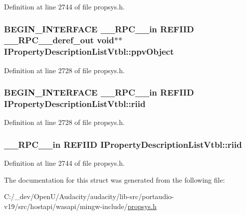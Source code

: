 Definition at line 2744 of file propsys.\+h.

\subsubsection[{\texorpdfstring{ppv\+Object}{ppvObject}}]{\setlength{\rightskip}{0pt plus 5cm}B\+E\+G\+I\+N\+\_\+\+I\+N\+T\+E\+R\+F\+A\+CE {\bf \+\_\+\+\_\+\+R\+P\+C\+\_\+\+\_\+in} {\bf R\+E\+F\+I\+ID} {\bf \+\_\+\+\_\+\+R\+P\+C\+\_\+\+\_\+deref\+\_\+out} {\bf void}$\ast$$\ast$ I\+Property\+Description\+List\+Vtbl\+::ppv\+Object}\hypertarget{struct_i_property_description_list_vtbl_a56cb57bc76ce9ed78155e1438c44836e}{}\label{struct_i_property_description_list_vtbl_a56cb57bc76ce9ed78155e1438c44836e}


Definition at line 2728 of file propsys.\+h.

\subsubsection[{\texorpdfstring{riid}{riid}}]{\setlength{\rightskip}{0pt plus 5cm}B\+E\+G\+I\+N\+\_\+\+I\+N\+T\+E\+R\+F\+A\+CE {\bf \+\_\+\+\_\+\+R\+P\+C\+\_\+\+\_\+in} {\bf R\+E\+F\+I\+ID} I\+Property\+Description\+List\+Vtbl\+::riid}\hypertarget{struct_i_property_description_list_vtbl_a314c26361430b79aed953c862b695f7f}{}\label{struct_i_property_description_list_vtbl_a314c26361430b79aed953c862b695f7f}


Definition at line 2728 of file propsys.\+h.

\subsubsection[{\texorpdfstring{riid}{riid}}]{ {\bf \+\_\+\+\_\+\+R\+P\+C\+\_\+\+\_\+in} {\bf R\+E\+F\+I\+ID} I\+Property\+Description\+List\+Vtbl\+::riid}\hypertarget{struct_i_property_description_list_vtbl_a9197cd7934c60e22e9ff2a27365a9a01}{}\label{struct_i_property_description_list_vtbl_a9197cd7934c60e22e9ff2a27365a9a01}


Definition at line 2744 of file propsys.\+h.



The documentation for this struct was generated from the following file\+:\begin{DoxyCompactItemize}
\item 
C\+:/\+\_\+dev/\+Open\+U/\+Audacity/audacity/lib-\/src/portaudio-\/v19/src/hostapi/wasapi/mingw-\/include/\hyperlink{propsys_8h}{propsys.\+h}\end{DoxyCompactItemize}
